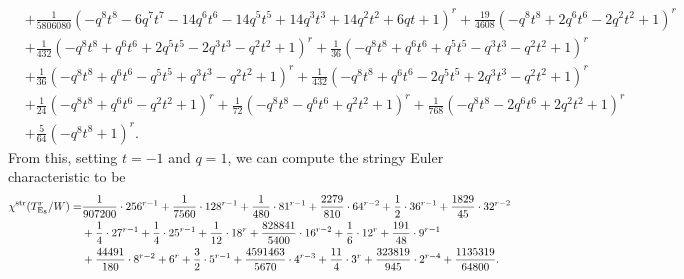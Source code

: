\documentclass[11pt,english]{amsart}
\numberwithin{equation}{section}
\numberwithin{figure}{section}
\theoremstyle{plain}
\theoremstyle{plain}
\theoremstyle{definition}
\theoremstyle{remark}
\newcommand{\E}{\operatorname{E}}
\newcommand{\str}{\textup{str}}
\begin{document}
{\begin{align*}
& + \frac{1}{5806080}  {\left(-q^{8} t^{8} - 6  q^{7} t^{7} - 14  q^{6} t^{6} - 14  q^{5} t^{5} + 14  q^{3} t^{3} + 14  q^{2} t^{2} + 6  q t + 1\right)}^{r} + \frac{19}{4608}  {\left(-q^{8} t^{8} + 2  q^{6} t^{6} - 2  q^{2} t^{2} + 1\right)}^{r} \\
& + \frac{1}{432}  {\left(-q^{8} t^{8} + q^{6} t^{6} + 2  q^{5} t^{5} - 2  q^{3} t^{3} - q^{2} t^{2} + 1\right)}^{r} + \frac{1}{36}  {\left(-q^{8} t^{8} + q^{6} t^{6} + q^{5} t^{5} - q^{3} t^{3} - q^{2} t^{2} + 1\right)}^{r} \\
& + \frac{1}{36}  {\left(-q^{8} t^{8} + q^{6} t^{6} - q^{5} t^{5} + q^{3} t^{3} - q^{2} t^{2} + 1\right)}^{r} + \frac{1}{432}  {\left(-q^{8} t^{8} + q^{6} t^{6} - 2  q^{5} t^{5} + 2  q^{3} t^{3} - q^{2} t^{2} + 1\right)}^{r} \\
& + \frac{1}{24}  {\left(-q^{8} t^{8} + q^{6} t^{6} - q^{2} t^{2} + 1\right)}^{r} + \frac{1}{72}  {\left(-q^{8} t^{8} - q^{6} t^{6} + q^{2} t^{2} + 1\right)}^{r} + \frac{1}{768}  {\left(-q^{8} t^{8} - 2  q^{6} t^{6} + 2  q^{2} t^{2} + 1\right)}^{r} \\
& + \frac{5}{64}  {\left(-q^{8} t^{8} + 1\right)}^{r}.
\end{align*}}
From this, setting $t = -1$ and $q = 1$, we can compute the stringy Euler characteristic to be
\begin{align*}
\chi^{\str}(T_{\E_8}^r/W) = & \frac{1}{907200} \cdot 256^{r - 1} + \frac{1}{7560} \cdot 128^{r - 1} + \frac{1}{480} \cdot 81^{r - 1} + \frac{2279}{810} \cdot 64^{r - 2} + \frac{1}{2} \cdot 36^{r - 1} + \frac{1829}{45} \cdot 32^{r - 2} \\
& + \frac{1}{4} \cdot 27^{r - 1} + \frac{1}{4} \cdot 25^{r - 1} + \frac{1}{12} \cdot 18^{r} + \frac{828841}{5400} \cdot 16^{r - 2} + \frac{1}{6} \cdot 12^{r} + \frac{191}{48} \cdot 9^{r - 1} \\
& + \frac{44491}{180} \cdot 8^{r - 2} + 6^{r} + \frac{3}{2} \cdot 5^{r - 1} + \frac{4591463}{5670} \cdot 4^{r - 3} + \frac{11}{4} \cdot 3^{r} + \frac{323819}{945} \cdot 2^{r - 4} + \frac{1135319}{64800}.
\end{align*}
\end{document}
